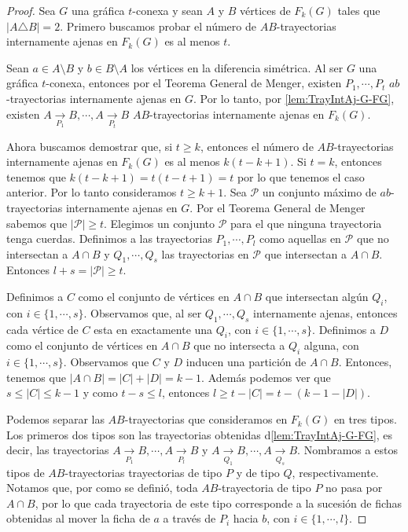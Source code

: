 \begin{proof}
    Sea $G$ una gr\'afica $t$-conexa y sean $A$ y $B$ v\'ertices de $F_{k}(G)$
    tales que $|A \triangle B| = 2$. Primero buscamos probar el n\'umero de
    $AB$-trayectorias internamente ajenas en $F_{k}(G)$ es al menos $t$. 
    
    Sean $a \in A \setminus B$ y $b \in B \setminus A$ los v\'ertices en la
    diferencia sim\'etrica. Al ser $G$ una gr\'afica $t$-conexa, entonces por el
    Teorema General de Menger, existen $P_{1}, \cdots, P_{t}$ $ab$-trayectorias
    internamente ajenas en $G$. Por lo tanto, por \cref{lem:TrayIntAj-G-FG},
    existen $A \xrightarrow[P_1]{}  B, \cdots, A \xrightarrow[P_t]{}  B$
    $AB$-trayectorias internamente ajenas en $F_{k}(G)$. 

    Ahora buscamos demostrar que, si $t \geq k$, entonces el n\'umero de
    $AB$-trayectorias internamente ajenas en $F_{k}(G)$ es al menos $k(t- k
    +1)$. Si $t=k$, entonces tenemos que $k(t - k + 1) = t(t-t+1) = t$ por lo
    que tenemos el caso anterior. Por lo tanto consideramos  $t \geq k + 1$. Sea
    $\mathcal{P}$ un conjunto m\'aximo de $ab$-trayectorias internamente ajenas
    en $G$. Por el Teorema General de Menger sabemos que $|\mathcal{P}| \ge t$.
    Elegimos un conjunto $\mathcal{P}$ para el que ninguna trayectoria tenga
    cuerdas. Definimos a las trayectorias $P_{1}, \cdots, P_{l}$ como aquellas en
    $\mathcal{P}$ que no intersectan a $A \cap B$ y $Q_{1}, \cdots, Q_{s}$ las
    trayectorias en $\mathcal{P}$ que intersectan a $A \cap B$. Entonces $l + s
    = |\mathcal{P}| \ge t$.

    Definimos a $C$ como el conjunto de v\'ertices en $A \cap B$ que intersectan
    alg\'un $Q_i$, con $i \in \{1, \cdots, s\}$. Observamos que, al ser $Q_1,
    \cdots, Q_s$ internamente ajenas, entonces cada v\'ertice de $C$ esta en
    exactamente una $Q_i$, con $i \in \{1, \cdots, s\}$. Definimos a $D$ como el
    conjunto de v\'ertices en $A \cap B$ que no intersecta a $Q_i$ alguna, con
    $i \in \{1, \cdots, s\}$. Observamos que $C$ y $D$ inducen una partici\'on
    de $A \cap B$. Entonces, tenemos que $|A\cap B| = |C| + |D| = k-1$. Adem\'as
    podemos ver que $s \leq |C| \leq k-1$ y como $ t - s \leq l$, entonces $l
    \geq t -|C| = t- (k-1-|D|)$.

    Podemos separar las $AB$-trayectorias que consideramos en $F_{k}(G)$ en tres
    tipos. Los primeros dos tipos son las trayectorias obtenidas
    d\cref{lem:TrayIntAj-G-FG}, es decir, las trayectorias $A
    \xrightarrow[P_1]{}  B, \cdots, A \xrightarrow[P_l]{}  B$ y $A
    \xrightarrow[Q_1]{}  B, \cdots, A \xrightarrow[Q_s]{}  B$. Nombramos a estos
    tipos de $AB$-trayectorias trayectorias de tipo $P$ y de tipo $Q$,
    respectivamente. Notamos que, por como se defini\'o, toda $AB$-trayectoria
    de tipo $P$ no pasa por $A\cap B$, por lo que cada trayectoria de este tipo
    corresponde a la sucesi\'on de fichas obtenidas al mover la ficha de $a$ a
    trav\'es de $P_i$ hacia $b$, con $i \in \{1, \cdots, l\}$.
    

\end{proof}
